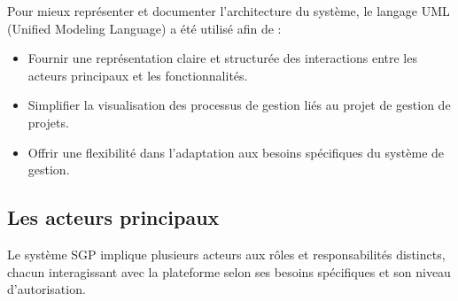 Pour mieux représenter et documenter l'architecture du système, le langage UML (Unified Modeling Language) a été utilisé afin de :
\begin{itemize}
    \item Fournir une représentation claire et structurée des interactions entre les acteurs principaux et les fonctionnalités.
    \item Simplifier la visualisation des processus de gestion liés au projet de gestion de projets.
    \item Offrir une flexibilité dans l'adaptation aux besoins spécifiques du système de gestion.
\end{itemize}

\subsection{Les acteurs principaux}

Le système SGP implique plusieurs acteurs aux rôles et responsabilités distincts, chacun interagissant avec la plateforme selon ses besoins spécifiques et son niveau d'autorisation.

